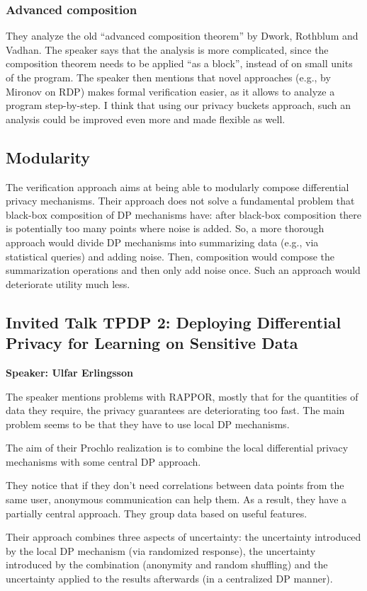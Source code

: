 \documentclass{article}
\begin{document}
\subsubsection{Advanced composition}
They analyze the old ``advanced composition theorem'' by Dwork, Rothblum and Vadhan. The speaker says that the analysis is more complicated, since the composition theorem needs to be applied ``as a block'', instead of on small units of the program. The speaker then mentions that novel approaches (e.g., by Mironov on RDP) makes formal verification easier, as it allows to analyze a program step-by-step.
I think that using our privacy buckets approach, such an analysis could be improved even more and made flexible as well.

\subsection{Modularity}
The verification approach aims at being able to modularly compose differential privacy mechanisms. Their approach does not solve a fundamental problem that black-box composition of DP mechanisms have: after black-box composition there is potentially too many points where noise is added. So, a more thorough approach would divide DP mechanisms into summarizing data (e.g., via statistical queries) and adding noise. Then, composition would compose the summarization operations and then only add noise once. Such an approach would deteriorate utility much less.


\subsection{Invited Talk TPDP 2: Deploying Differential Privacy for Learning on Sensitive Data}
\noindent\textbf{Speaker: Ulfar Erlingsson}

The speaker mentions problems with RAPPOR, mostly that for the quantities of data they require, the privacy guarantees are deteriorating too fast. The main problem seems to be that they have to use local DP mechanisms. 

The aim of their Prochlo realization is to combine the local differential privacy mechanisms with some central DP approach.

They notice that if they don’t need correlations between data points from the same user, anonymous communication can help them. As a result, they have a partially central approach. They group data based on useful features.

Their approach combines three aspects of uncertainty: the uncertainty introduced by the local DP mechanism (via randomized response), the uncertainty introduced by the combination (anonymity and random shuffling) and the uncertainty applied to the results afterwards (in a centralized DP manner). 
\end{document}

